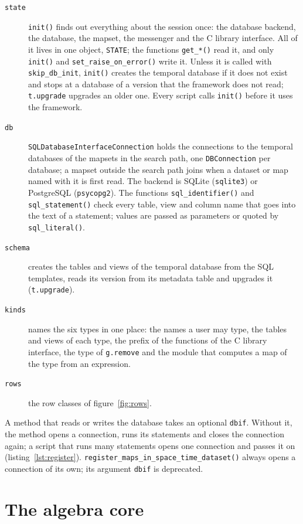 \documentclass[10pt,a4paper]{article}
\newcommand{\code}[1]{\texttt{#1}}
\begin{document}
\begin{description}
\item[\code{state}] \code{init()} finds out everything about the session
  once: the database backend, the database, the mapset, the messenger and the
  C library interface. All of it lives in one object, \code{STATE}; the
  functions \code{get\_*()} read it, and only \code{init()} and
  \code{set\_raise\_on\_error()} write it. Unless it is called with
  \code{skip\_db\_init}, \code{init()} creates the temporal database if it
  does not exist and stops at a database of a version that the framework does
  not read; \code{t.upgrade} upgrades an older one. Every script calls
  \code{init()} before it uses the framework.
\item[\code{db}] \code{SQLDatabaseInterfaceConnection} holds the connections
  to the temporal databases of the mapsets in the search path, one
  \code{DBConnection} per database; a mapset outside the search path joins
  when a dataset or map named with it is first read. The backend is SQLite
  (\code{sqlite3}) or PostgreSQL (\code{psycopg2}). The functions
  \code{sql\_identifier()} and \code{sql\_statement()} check every table,
  view and column name that goes into the text of a statement; values are
  passed as parameters or quoted by \code{sql\_literal()}.
\item[\code{schema}] creates the tables and views of the temporal database
  from the SQL templates, reads its version from its metadata table and
  upgrades it (\code{t.upgrade}).
\item[\code{kinds}] names the six types in one place: the names a user may
  type, the tables and views of each type, the prefix of the functions of the
  C library interface, the type of \code{g.remove} and the module that
  computes a map of the type from an expression.
\item[\code{rows}] the row classes of figure~\ref{fig:rows}.
\end{description}

\noindent A method that reads or writes the database takes an optional
\code{dbif}. Without it, the method opens a connection, runs its statements and
closes the connection again; a script that runs many statements opens one
connection and passes it on (listing~\ref{lst:register}).
\code{register\_maps\_in\_space\_time\_dataset()} always opens a connection
of its own; its argument \code{dbif} is deprecated.

\section{The algebra core}
\label{sec:algebra}
\end{document}
